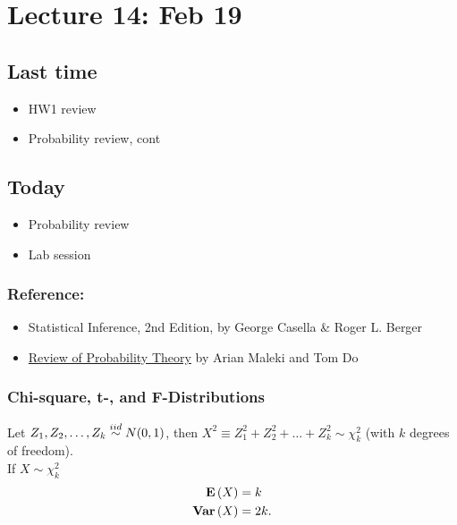 \setcounter{section}{13}


\section{Lecture 14: Feb 19}


\subsection*{Last time}
\begin{itemize}
 \item HW1 review 
 \item Probability review, cont 
\end{itemize}


\subsection*{Today}
\begin{itemize}
  \item Probability review
  \item Lab session
\end{itemize}

\subsubsection*{Reference: }
\begin{itemize}
  \item Statistical Inference, 2nd Edition, by George Casella \& Roger L. Berger
  \item  \href{http://cs229.stanford.edu/section/cs229-prob.pdf}{Review of Probability Theory} by Arian Maleki and Tom Do
\end{itemize}

\subsubsection*{Chi-square, t-, and F-Distributions}
Let $Z_1, Z_2, \dots, Z_k \overset{iid}{\sim} N(0, 1)$, then $X^2 \equiv Z_1^2 + Z_2^2 + \dots + Z_k^2 \sim \chi_k^2$ (with $k$ degrees of freedom).\\
If $X \sim \chi_k^2$
$$
\begin{aligned}
{\mathbf{E}\left(X\right)} &= k\\
\mathbf{Var}\left(X\right) &= 2k.\\
\end{aligned}
$$

